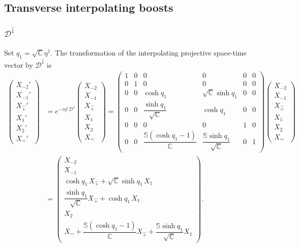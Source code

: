 \documentclass[foundations,article,submit,pdftex,moreauthors]{Definitions/mdpi}
\begin{document}
\subsection{Transverse interpolating boosts}

\subsubsection{\texorpdfstring{$\mathcal{D}^{\hat{1}}$}{D1}}

Set $q_1=\sqrt{\mathbb{C}}\eta^{1}$. The transformation of the interpolating
projective space-time vector by $\mathcal{D}^{\hat{1}}$ is
\begin{align}
\begin{pmatrix}
X_{-2}'\\ X_{-1}'\\ X_{\hat{+}}'\\ X_1'\\ X_2'\\ X_{\hat{-}}'
\end{pmatrix}
&=e^{-i\eta^{1}\mathcal{D}^{\hat{1}}}
\begin{pmatrix}
X_{-2}\\ X_{-1}\\ X_{\hat{+}}\\ X_1\\ X_2\\ X_{\hat{-}}
\end{pmatrix}
=\begin{pmatrix}
1 & 0 & 0 & 0 & 0 & 0\\
0 & 1 & 0 & 0 & 0 & 0\\
0 & 0 & \cosh q_1 & \sqrt{\mathbb{C}}\sinh q_1 & 0 & 0\\
0 & 0 & \dfrac{\sinh q_1}{\sqrt{\mathbb{C}}} & \cosh q_1 & 0 & 0\\
0 & 0 & 0 & 0 & 1 & 0\\
0 & 0 & \dfrac{\mathbb{S}(\cosh q_1-1)}{\mathbb{C}} & \dfrac{\mathbb{S}\sinh q_1}{\sqrt{\mathbb{C}}} & 0 & 1\label{A100}
\end{pmatrix}
\begin{pmatrix}
X_{-2}\\ X_{-1}\\ X_{\hat{+}}\\ X_1\\ X_2\\ X_{\hat{-}}
\end{pmatrix}\\
&=\begin{pmatrix}
X_{-2}\\ X_{-1}\\
\cosh q_1\,X_{\hat{+}}+\sqrt{\mathbb{C}}\sinh q_1\,X_1\\
\dfrac{\sinh q_1}{\sqrt{\mathbb{C}}}X_{\hat{+}}+\cosh q_1\,X_1\\
X_2\\
X_{\hat{-}}+\dfrac{\mathbb{S}(\cosh q_1-1)}{\mathbb{C}}X_{\hat{+}}
+\dfrac{\mathbb{S}\sinh q_1}{\sqrt{\mathbb{C}}}X_1
\end{pmatrix}.
\end{align}
\end{document}
